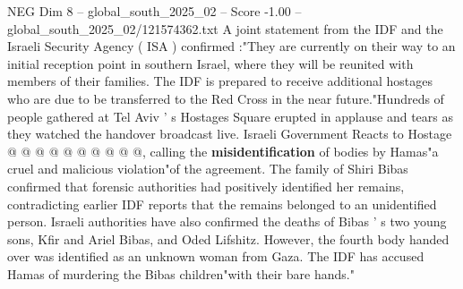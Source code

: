 \begin{textsample}{NEG Dim 8 – global\_south\_2025\_02 – Score -1.00 – global\_south\_2025\_02/121574362.txt}
A joint statement from the IDF and the Israeli Security Agency ( ISA ) confirmed :"They are currently on their way to an initial reception point in southern Israel, where they will be reunited with members of their families.
The IDF is prepared to receive additional hostages who are due to be transferred to the Red Cross in the near future."Hundreds of people gathered at Tel Aviv ' s Hostages Square erupted in applause and tears as they watched the handover broadcast live.
Israeli Government Reacts to Hostage @ @ @ @ @ @ @ @ @ @, calling the \textbf{misidentification} of bodies by Hamas"a cruel and malicious violation"of the agreement.
The family of Shiri Bibas confirmed that forensic authorities had positively identified her remains, contradicting earlier IDF reports that the remains belonged to an unidentified person.
Israeli authorities have also confirmed the deaths of Bibas ' s two young sons, Kfir and Ariel Bibas, and Oded Lifshitz.
However, the fourth body handed over was identified as an unknown woman from Gaza.
The IDF has accused Hamas of murdering the Bibas children"with their bare hands."

\end{textsample}
